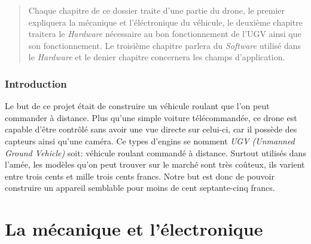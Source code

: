 \documentclass[a4paper,12pt]{article}
\begin{document}
{\clearpage
\begin{abstract}
Chaque chapitre de ce dossier traite d'une partie du drone, le premier expliquera la mécanique et l'éléctronique du véhicule, le deuxième chapitre traitera le \textit{Hardware} nécessaire au bon fonctionnement de l'UGV ainsi que son fonctionnement. Le troisième chapitre parlera du \textit{Software} utilisé dans le \textit{Hardware} et le denier chapitre concernera les champs d'application. 
\end{abstract}
\clearpage
\tableofcontents
\clearpage
\listoffigures
\listoftables 
\clearpage



\section*{Introduction}
Le but de ce projet était de construire un véhicule roulant que l'on peut commander à distance. Plus qu'une simple voiture télécommandée, ce drone est capable d'être contrôlé sans avoir une vue directe sur celui-ci, car il possède des capteurs ainsi qu'une caméra. Ce types d'engins se nomment \textit{UGV (Unmanned Ground Vehicle)} soit: véhicule roulant commandé à distance. Surtout utilisés dans l'amée, les modèles qu'on peut trouver sur le marché sont très coûteux, ils varient entre trois cents et mille trois cents francs. Notre but est donc de pouvoir construire un appareil semblable pour moins de cent septante-cinq francs. 
\clearpage
\part{La mécanique et l'électronique}


}
\end{document}

